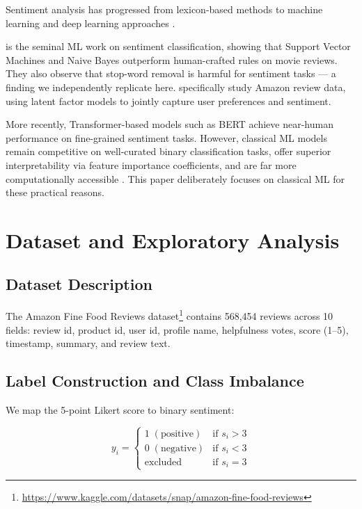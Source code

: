 \documentclass[11pt,a4paper]{article}
\begin{document}
Sentiment analysis has progressed from lexicon-based methods
\citep{hutto2014vader,baccianella2010sentiwordnet} to machine learning
\citep{pang2002thumbs} and deep learning approaches \citep{maas2011learning}.

\citet{pang2002thumbs} is the seminal ML work on sentiment classification,
showing that Support Vector Machines and Naive Bayes outperform human-crafted
rules on movie reviews.
They also observe that stop-word removal is harmful for sentiment tasks ---
a finding we independently replicate here.
\citet{mcauley2013hidden} specifically study Amazon review data, using
latent factor models to jointly capture user preferences and sentiment.

More recently, Transformer-based models such as BERT
\citep{devlin2019bert} achieve near-human performance on fine-grained
sentiment tasks.
However, classical ML models remain competitive on well-curated binary
classification tasks, offer superior interpretability via feature importance
coefficients, and are far more computationally accessible
\citep{pang2008opinion}.
This paper deliberately focuses on classical ML for these practical reasons.

\section{Dataset and Exploratory Analysis}
\label{sec:data}

\subsection{Dataset Description}

The Amazon Fine Food Reviews dataset\footnote{%
  \url{https://www.kaggle.com/datasets/snap/amazon-fine-food-reviews}}
contains 568,454 reviews across 10 fields: review id, product id,
user id, profile name, helpfulness votes, score (1--5), timestamp,
summary, and review text.

\subsection{Label Construction and Class Imbalance}

We map the 5-point Likert score to binary sentiment:

\begin{equation}
  y_i = \begin{cases}
    1 \;(\text{positive}) & \text{if } s_i > 3 \\
    0 \;(\text{negative}) & \text{if } s_i < 3 \\
    \text{excluded}       & \text{if } s_i = 3
  \end{cases}
\end{equation}
\end{document}
